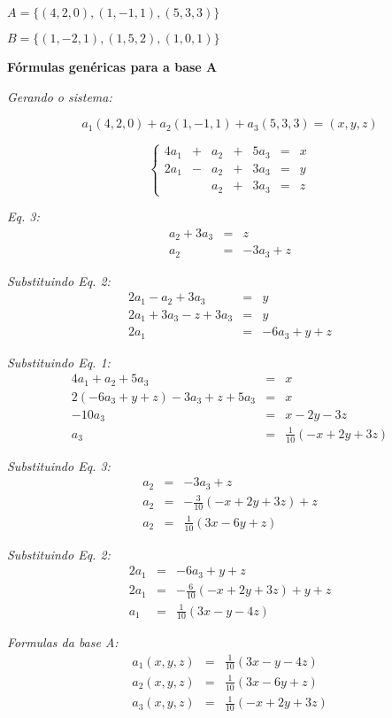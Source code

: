 \documentclass[11pt]{article}
\newenvironment{question}[1]
  {\par\addvspace{\medskipamount}
   \noindent\makebox[0pt][r]{\textbf{#1)} }\ignorespaces}
  {\par\addvspace{\medskipamount}}
\begin{document}
\begin{question}{1}
$A=\{(4, 2, 0),(1, -1, 1),(5, 3, 3)\}$

$B=\{(1, -2, 1),(1, 5, 2),(1, 0, 1)\}$

\bigskip
\textbf{Fórmulas genéricas para a base A}

\bigskip
\textit{Gerando o sistema:} 

$$a_1(4,2,0)+a_2(1,-1,1)+a_3(5,3,3)=(x,y,z)$$

$$
\left\{\begin{array}{rcrcrcr}
    4a_1 &+ &a_2 &+ &5a_3 &= &x\\
    2a_1 &- &a_2 &+ &3a_3 &= &y\\
         &  &a_2 &+ &3a_3 &= &z
\end{array}\right.
$$

\textit{Eq. 3:}
$$
\begin{array}{rcl}
    a_2+3a_3 &= &z\\
    a_2 &= &-3a_3+z
\end{array}
$$

\bigskip
\textit{Substituindo Eq. 2:}
$$
\begin{array}{rcl}
    2a_1-a_2+3a_3 &= &y\\
    2a_1+3a_3-z+3a_3 &= &y\\
    2a_1 &= &-6a_3+y+z
\end{array}
$$

\bigskip
\textit{Substituindo Eq. 1:}
$$
\begin{array}{rcl}
    4a_1+a_2+5a_3 &= &x\\
    2(-6a_3+y+z)-3a_3+z+5a_3 &= &x\\
    -10a_3 &= &x-2y-3z\\
    a_3 &= &\frac{1}{10}(-x+2y+3z)
\end{array}
$$

\bigskip
\textit{Substituindo Eq. 3:}
$$
\begin{array}{rcl}
    a_2 &= &-3a_3+z\\
    a_2 &= &-\frac{3}{10}(-x+2y+3z)+z\\
    a_2 &= &\frac{1}{10}(3x-6y+z)
\end{array}
$$

\bigskip
\textit{Substituindo Eq. 2:}
$$
\begin{array}{rcl}
    2a_1 &= &-6a_3+y+z\\
    2a_1 &= &-\frac{6}{10}(-x+2y+3z)+y+z\\
    a_1 &= &\frac{1}{10}(3x-y-4z)
\end{array}
$$

\bigskip
\textit{Formulas da base A:}
$$
\begin{array}{rcl}
    a_1(x,y,z) &= &\frac{1}{10}(3x-y-4z)\\
    a_2(x,y,z) &= &\frac{1}{10}(3x-6y+z)\\
    a_3(x,y,z) &= &\frac{1}{10}(-x+2y+3z)
\end{array}
$$
\end{question}
\end{document}
